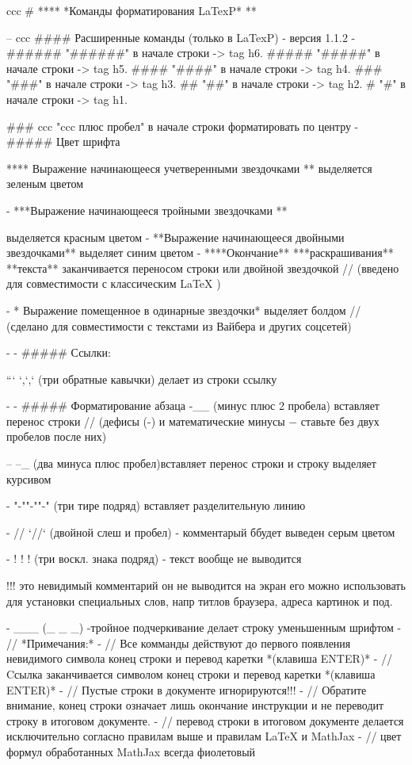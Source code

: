 ﻿ccc # **** *Команды форматирования LaTexP* ** 

-- ccc  ####  Расширенные команды (только в LaTexP) -  версия 1.1.2
- 
   ######      "######" в начале строки ->   tag h6.
   #####       "#####"  в начале строки ->   tag h5. 
   ####        "####"   в начале строки ->   tag h4.
   ###         "###" в начале строки -> tag h3.
   ##          "##" в начале строки -> tag h2.
   #           "#" в начале строки -> tag h1.

 
###  ccc  "ccc плюс пробел"  в начале строки форматировать по центру
-  
##### Цвет шрифта


   **** Выражение начинающееся учетверенными звездочками **  выделяется зеленым цветом
 
-  
***Выражение начинающееся тройными звездочками ** 

  выделяется красным цветом
-  
**Выражение начинающееся двойными звездочками**  выделяет синим цветом
-  
  ****Окончание** ***раскрашивания** 
  **текста** 
   заканчивается переносом строки или двойной звездочкой // (введено для совместимости с классическим LaTeX )
 
-  * Выражение помещенное в одинарные звездочки*  выделяет болдом // (сделано для совместимости с текстами из Вайбера и других соцсетей)

-  
-  
##### Ссылки:

   ```  `,`,`  (три обратные кавычки) делает из строки ссылку



-    
-  
##### Форматирование абзаца  
   -__        (минус плюс 2 пробела) вставляет перенос строки //  (дефисы (-) и математические минусы \(-\) ставьте без двух пробелов после них)

--     --_       (два минуса плюс пробел)вставляет перенос строки и строку выделяет курсивом

-     "-""-""-"  (три тире подряд) вставляет разделительную линию

-  //  `//`            (двойной слеш и пробел) - комментарый ббудет выведен серым цветом

-   ! ! !       (три воскл. знака подряд) -  текст вообще не выводится

 !!!          это невидимый комментарий он не выводится на экран его можно использовать для установки специальных слов, напр титлов браузера, адреса картинок и под. 

-  ___          (_ _ _)  -тройное подчеркивание делает строку уменьшенным шрифтом
-  //  *Примечания:*
-  // Все комманды действуют до первого появления невидимого символа конец строки и перевод каретки *(клавиша ENTER)*
-  // Cсылка заканчивается символом конец строки и перевод каретки *(клавиша ENTER)* 
-  // Пустые строки в документе игнорируются!!!
-  // Обратите внимание, конец строки означает лишь окончание инструкции и не переводит строку в итоговом документе.
-  // перевод строки в итоговом документе делается исключительно согласно правилам выше и правилам LaTeX и MathJax
-  // цвет формул обработанных MathJax  всегда фиолетовый


